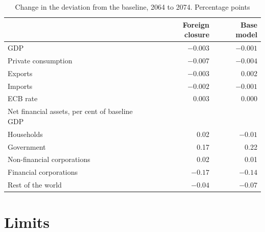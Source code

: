 \documentclass[11pt,a4paper]{article}
\begin{document}
\begin{table}[H]
\centering
\small
\caption{Change in the deviation from the baseline, 2064 to 2074. Percentage points}
\label{tab:flat}
\begin{tabular}{@{}lrr@{}}
\toprule
 & Foreign closure & Base model \\
\midrule
GDP & $-0.003$ & $-0.001$ \\
Private consumption & $-0.007$ & $-0.004$ \\
Exports & $-0.003$ & 0.002 \\
Imports & $-0.002$ & $-0.001$ \\
ECB rate & 0.003 & 0.000 \\
\midrule
Net financial assets, per cent of baseline GDP & & \\
\quad Households & 0.02 & $-0.01$ \\
\quad Government & 0.17 & 0.22 \\
\quad Non-financial corporations & 0.02 & 0.01 \\
\quad Financial corporations & $-0.17$ & $-0.14$ \\
\quad Rest of the world & $-0.04$ & $-0.07$ \\
\bottomrule
\end{tabular}
\end{table}

\FloatBarrier
\section{Limits}
\label{sec:limits}
\end{document}
